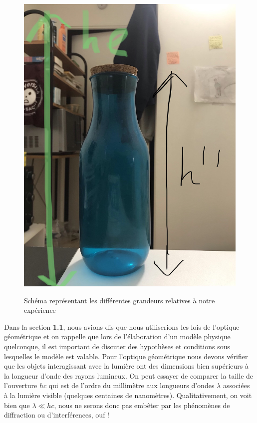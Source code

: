 \documentclass[12pt,a4paper]{article}
\begin{document}
\begin{figure}[H]
\begin{center}
	{\includegraphics[scale=0.125]{Figures/s2.jpg}}
\caption{Schéma représentant les différentes grandeurs relatives à notre expérience}
\end{center}
\end{figure}
Dans la section \textbf{1.1}, nous avions dis que nous utiliserions les lois de l'optique géométrique et on rappelle que lors de l'élaboration d'un modèle physique quelconque, il est important de discuter des hypothèses et conditions sous lesquelles le modèle est valable. Pour l'optique géométrique nous devons vérifier que les objets interagissant avec la lumière ont des dimensions bien supérieurs à la longueur d'onde des rayons lumineux. On  peut essayer de comparer la taille de l'ouverture $hc$ qui est de l'ordre du millimètre aux longueurs d'ondes $\lambda$ associées à la lumière visible (quelques centaines de nanomètres). Qualitativement, on voit bien que $\lambda \ll hc$, nous ne serons donc pas embêter par les phénomènes de diffraction ou d'interférences, ouf ! \\
 
\end{document}
